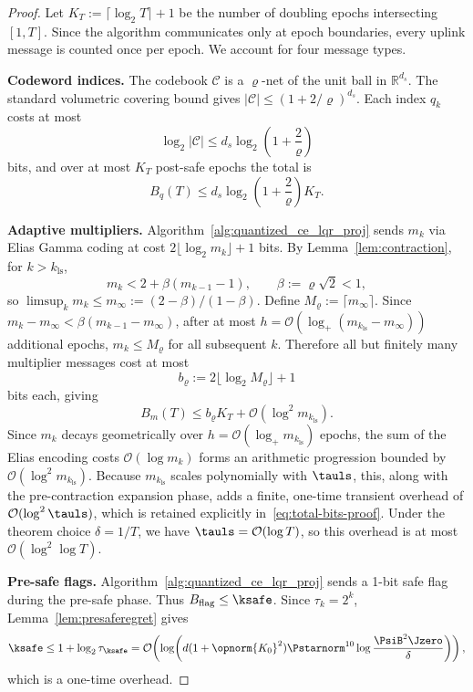 \documentclass[11pt,journal,onecolumn]{IEEEtran}
\begin{document}
\begin{proof}
Let $K_T := \lceil \log_2 T \rceil + 1$ be the number of doubling epochs intersecting $[1,T]$. Since the algorithm communicates only at epoch boundaries, every uplink message is counted once per epoch. We account for four message types.

\medskip\noindent\textbf{Codeword indices.}
The codebook $\mathcal{C}$ is a $\varrho$-net of the unit ball in $\mathbb{R}^{d_s}$. The standard volumetric covering bound gives $|\mathcal{C}| \le (1 + 2/\varrho)^{d_s}$. Each index $q_k$ costs at most
\[
    \log_2 |\mathcal{C}| \le d_s \log_2\!\left(1 + \frac{2}{\varrho}\right)
\]
bits, and over at most $K_T$ post-safe epochs the total is
\begin{equation}\label{eq:Bq}
    B_q(T) \le d_s \log_2\!\left(1 + \frac{2}{\varrho}\right) K_T.
\end{equation}

\medskip\noindent\textbf{Adaptive multipliers.}
Algorithm~\ref{alg:quantized_ce_lqr_proj} sends $m_k$ via Elias Gamma coding at cost $2\lfloor \log_2 m_k \rfloor + 1$ bits. By Lemma~\ref{lem:contraction}, for $k > k_{\mathrm{ls}}$,
\[
    m_k < 2 + \beta(m_{k-1} - 1), \qquad \beta := \varrho\sqrt{2} < 1,
\]
so $\limsup_k m_k \le m_\infty := (2 - \beta)/(1 - \beta)$. Define $M_\varrho := \lceil m_\infty \rceil$. Since $m_k - m_\infty < \beta(m_{k-1} - m_\infty)$, after at most $h = \mathcal{O}(\log_+(m_{k_{\mathrm{ls}}} - m_\infty))$ additional epochs, $m_k \le M_\varrho$ for all subsequent $k$. Therefore all but finitely many multiplier messages cost at most
\[
    b_\varrho := 2\lfloor \log_2 M_\varrho \rfloor + 1
\]
bits each, giving
\begin{equation}\label{eq:Bm}
    B_m(T) \le b_\varrho K_T + \mathcal{O}(\log^2 m_{k_{\mathrm{ls}}}).
\end{equation}
Since $m_k$ decays geometrically over $h = \mathcal{O}(\log_+ m_{k_{\mathrm{ls}}})$ epochs, the sum of the Elias encoding costs $\mathcal{O}(\log m_k)$ forms an arithmetic progression bounded by $\mathcal{O}(\log^2 m_{k_{\mathrm{ls}}})$. Because $m_{k_{\mathrm{ls}}}$ scales polynomially with $\tauls$, this, along with the pre-contraction expansion phase, adds a finite, one-time transient overhead of $\mathcal{O}(\log^2 \tauls)$, which is retained explicitly in~\eqref{eq:total-bits-proof}. Under the theorem choice $\delta = 1/T$, we have $\tauls = \mathcal{O}(\log T)$, so this overhead is at most $\mathcal{O}(\log^2\!\log T)$.

\medskip\noindent\textbf{Pre-safe flags.}
Algorithm~\ref{alg:quantized_ce_lqr_proj} sends a 1-bit safe flag during the pre-safe phase. Thus $B_{\mathrm{flag}} \le \ksafe$. Since $\tau_k = 2^k$, Lemma~\ref{lem:presaferegret} gives
\begin{equation}\label{eq:Bflag}
    \ksafe \le 1 + \log_2 \tau_{\ksafe} = \mathcal{O}\!\left(\log\!\left(d(1+\opnorm{K_0}^2)\Pstarnorm^{10}\log\frac{\PsiB^2 \Jzero}{\delta}\right)\right),
\end{equation}
which is a one-time overhead.


\end{proof}
\end{document}
